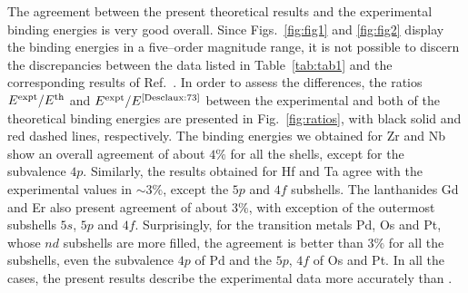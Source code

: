 The agreement between the present theoretical results and the
experimental binding energies is very good overall.
Since Figs.~\ref{fig:fig1} and \ref{fig:fig2} display the binding
energies in a five--order magnitude range, it is not possible to
discern the discrepancies between the data listed in Table~\ref{tab:tab1}
and the corresponding results of Ref.~\cite{Desclaux:73}.
In order to assess the differences, the ratios $E^{\mbox{\scriptsize expt}}/E^{\mbox{\scriptsize th}}$
and $E^{\mbox{\scriptsize expt}}/E^{\mbox{\scriptsize \cite{Desclaux:73}}}$
between the experimental and both of the theoretical binding energies
are presented in Fig.~\ref{fig:ratios}, with black solid and red dashed
lines, respectively.
The binding energies we obtained for Zr and Nb show an
overall agreement of about $4\%$ for all the shells, except for the
subvalence $4p$. Similarly, the results obtained for Hf and Ta agree
with the experimental values in $\sim3\%$, except the $5p$ and $4f$
subshells. The lanthanides Gd and Er also present agreement of about
$3\%$, with exception of the outermost subshells $5s$, $5p$ and $4f$.
Surprisingly, for the transition metals Pd, Os and Pt, whose $nd$
subshells are more filled, the agreement is better than $3\%$ for all
the subshells, even the subvalence $4p$ of Pd and the $5p$, $4f$ of
Os and Pt. In all the cases, the present results describe the experimental data 
more accurately than \cite{Desclaux:73}.



